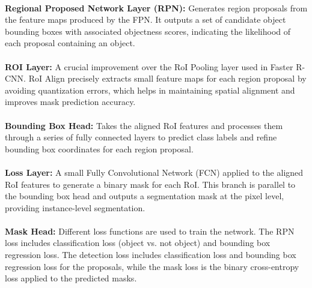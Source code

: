 \documentclass[12pt, English]{article}
\begin{document}
\\
\textbf{Regional Proposed Network Layer (RPN): } Generates region proposals from the feature maps produced by the FPN. It outputs a set of candidate object bounding boxes with associated objectness scores, indicating the likelihood of each proposal containing an object.\\
\\
\textbf{ROI Layer: }A crucial improvement over the RoI Pooling layer used in Faster R-CNN. RoI Align precisely extracts small feature maps for each region proposal by avoiding quantization errors, which helps in maintaining spatial alignment and improves mask prediction accuracy.\\
\\
\textbf{Bounding Box Head: }Takes the aligned RoI features and processes them through a series of fully connected layers to predict class labels and refine bounding box coordinates for each region proposal.\\
\\
\textbf{Loss Layer: }A small Fully Convolutional Network (FCN) applied to the aligned RoI features to generate a binary mask for each RoI. This branch is parallel to the bounding box head and outputs a segmentation mask at the pixel level, providing instance-level segmentation.\\
\\
\textbf{Mask Head: }Different loss functions are used to train the network. The RPN loss includes classification loss (object vs. not object) and bounding box regression loss. The detection loss includes classification loss and bounding box regression loss for the proposals, while the mask loss is the binary cross-entropy loss applied to the predicted masks.\\
\\

\newpage
\end{document}
